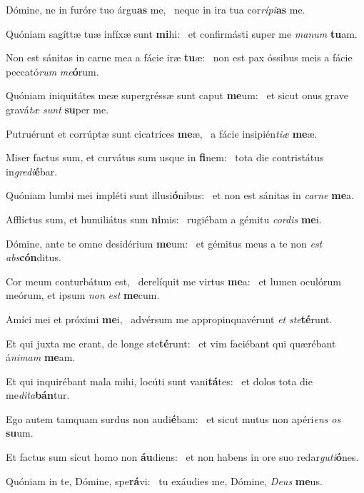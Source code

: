 \item Dómine, ne in furóre tuo árgu\textbf{as} me,~\psstar{} neque in ira tua cor\textit{rípi}\textbf{as} me.
\item Quóniam sagíttæ tuæ infíxæ sunt \textbf{mi}hi:~\psstar{} et confirmásti super me \textit{manum} \textbf{tu}am.
\item Non est sánitas in carne mea a fácie iræ \textbf{tu}æ:~\psstar{} non est pax óssibus meis a fácie peccató\textit{rum} \textit{me}\textbf{ó}rum.
\item Quóniam iniquitátes meæ supergréssæ sunt caput \textbf{me}um:~\psstar{} et sicut onus grave gravá\textit{tæ} \textit{sunt} \textbf{su}per me.
\item Putruérunt et corrúptæ sunt cicatríces \textbf{me}æ,~\psstar{} a fácie insipién\textit{tiæ} \textbf{me}æ.
\item Miser factus sum, et curvátus sum usque in \textbf{fi}nem:~\psstar{} tota die contristátus in\textit{gredi}\textbf{é}bar.
\item Quóniam lumbi mei impléti sunt illusi\textbf{ó}nibus:~\psstar{} et non est sánitas in \textit{carne} \textbf{me}a.
\item Afflíctus sum, et humiliátus sum \textbf{ni}mis:~\psstar{} rugiébam a gémitu \textit{cordis} \textbf{me}i.
\item Dómine, ante te omne desidérium \textbf{me}um:~\psstar{} et gémitus meus a te non \textit{est} \textit{abs}\textbf{cón}ditus.
\item Cor meum conturbátum est,~\pscross{} derelíquit me virtus \textbf{me}a:~\psstar{} et lumen oculórum meórum, et ipsum \textit{non} \textit{est} \textbf{me}cum.
\item Amíci mei et próximi \textbf{me}i,~\psstar{} advérsum me appropinquavérunt \textit{et} \textit{ste}\textbf{té}runt.
\item Et qui juxta me erant, de longe ste\textbf{té}runt:~\psstar{} et vim faciébant qui quærébant á\textit{nimam} \textbf{me}am.
\item Et qui inquirébant mala mihi, locúti sunt vani\textbf{tá}tes:~\psstar{} et dolos tota die me\textit{dita}\textbf{bán}tur.
\item Ego autem tamquam surdus non audi\textbf{é}bam:~\psstar{} et sicut mutus non apéri\textit{ens} \textit{os} \textbf{su}um.
\item Et factus sum sicut homo non \textbf{áu}diens:~\psstar{} et non habens in ore suo redar\textit{guti}\textbf{ó}nes.
\item Quóniam in te, Dómine, spe\textbf{rá}vi:~\psstar{} tu exáudies me, Dómine, \textit{Deus} \textbf{me}us.

